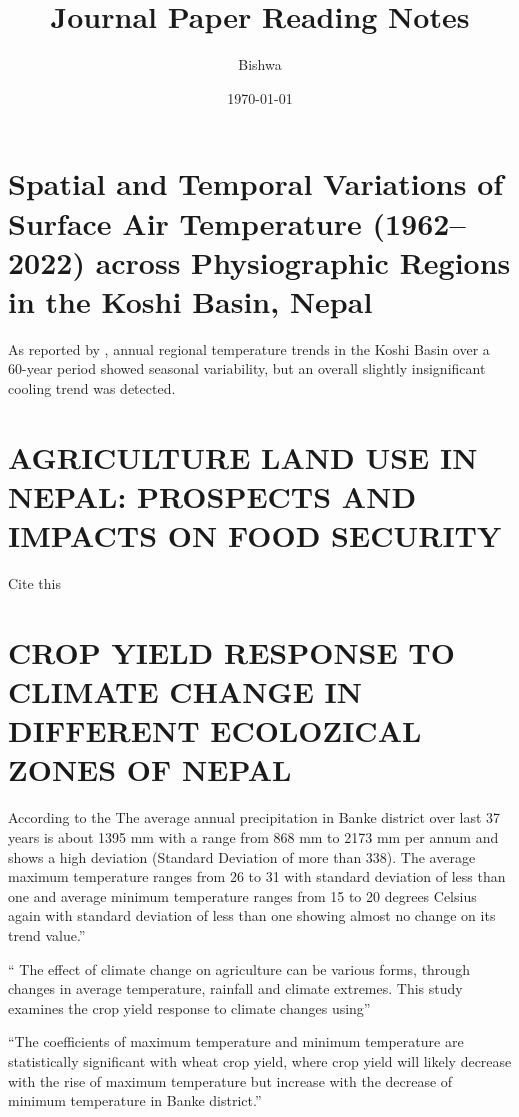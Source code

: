 \documentclass[a4paper,12pt]{article}
\title{Journal Paper Reading Notes}
\author{Bishwa}
\date{\today}
\begin{document}
\maketitle




\section{Spatial and Temporal Variations of Surface Air Temperature (1962–2022) across Physiographic Regions in the Koshi Basin, Nepal}
\parencite{puriSpatialTemporalVariations2024}
As reported by \parencite{puriSpatialTemporalVariations2024}, annual regional temperature trends in the Koshi Basin over a 60-year period showed seasonal variability, but an overall slightly insignificant cooling trend was detected.

\section{AGRICULTURE LAND USE IN NEPAL: PROSPECTS AND IMPACTS ON FOOD SECURITY}
Cite this \parencite{timilsinaAGRICULTURELANDUSE2019}

\section{CROP YIELD RESPONSE TO CLIMATE CHANGE IN DIFFERENT ECOLOZICAL ZONES OF NEPAL}
According to the \parencite{regmiCROPYIELDRESPONSE2019} The average annual precipitation in Banke district over last 37 years is about 1395 mm with a range from 868 mm to 2173 mm per annum and shows a high deviation (Standard Deviation of more than 338). 
The average maximum temperature ranges from 26 to 31 with standard deviation of less than one and average minimum temperature ranges from 15 to 20 degrees Celsius again with standard deviation of less than one showing almost no change on its trend value.” 

“\parencite{regmiCROPYIELDRESPONSE2019} The effect of climate change on agriculture can be various forms, through changes in average temperature, rainfall and climate extremes. This study examines the crop yield response to climate changes using”

“The coefficients of maximum temperature and minimum temperature are statistically significant with wheat crop yield, where crop yield will likely decrease with the rise of maximum temperature but increase with the decrease of minimum temperature in Banke district.” 
\end{document}
